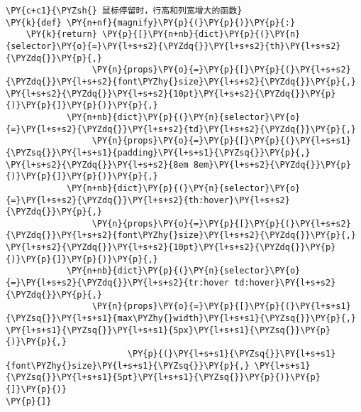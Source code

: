     \begin{tcolorbox}[breakable, size=fbox, boxrule=1pt, pad at break*=1mm,colback=cellbackground, colframe=cellborder]
\begin{Verbatim}[commandchars=\\\{\}]
\PY{c+c1}{\PYZsh{} 鼠标停留时，行高和列宽增大的函数}
\PY{k}{def} \PY{n+nf}{magnify}\PY{p}{(}\PY{p}{)}\PY{p}{:}
    \PY{k}{return} \PY{p}{[}\PY{n+nb}{dict}\PY{p}{(}\PY{n}{selector}\PY{o}{=}\PY{l+s+s2}{\PYZdq{}}\PY{l+s+s2}{th}\PY{l+s+s2}{\PYZdq{}}\PY{p}{,}
                 \PY{n}{props}\PY{o}{=}\PY{p}{[}\PY{p}{(}\PY{l+s+s2}{\PYZdq{}}\PY{l+s+s2}{font\PYZhy{}size}\PY{l+s+s2}{\PYZdq{}}\PY{p}{,} \PY{l+s+s2}{\PYZdq{}}\PY{l+s+s2}{10pt}\PY{l+s+s2}{\PYZdq{}}\PY{p}{)}\PY{p}{]}\PY{p}{)}\PY{p}{,}
            \PY{n+nb}{dict}\PY{p}{(}\PY{n}{selector}\PY{o}{=}\PY{l+s+s2}{\PYZdq{}}\PY{l+s+s2}{td}\PY{l+s+s2}{\PYZdq{}}\PY{p}{,}
                 \PY{n}{props}\PY{o}{=}\PY{p}{[}\PY{p}{(}\PY{l+s+s1}{\PYZsq{}}\PY{l+s+s1}{padding}\PY{l+s+s1}{\PYZsq{}}\PY{p}{,} \PY{l+s+s2}{\PYZdq{}}\PY{l+s+s2}{8em 8em}\PY{l+s+s2}{\PYZdq{}}\PY{p}{)}\PY{p}{]}\PY{p}{)}\PY{p}{,}
            \PY{n+nb}{dict}\PY{p}{(}\PY{n}{selector}\PY{o}{=}\PY{l+s+s2}{\PYZdq{}}\PY{l+s+s2}{th:hover}\PY{l+s+s2}{\PYZdq{}}\PY{p}{,}
                 \PY{n}{props}\PY{o}{=}\PY{p}{[}\PY{p}{(}\PY{l+s+s2}{\PYZdq{}}\PY{l+s+s2}{font\PYZhy{}size}\PY{l+s+s2}{\PYZdq{}}\PY{p}{,} \PY{l+s+s2}{\PYZdq{}}\PY{l+s+s2}{10pt}\PY{l+s+s2}{\PYZdq{}}\PY{p}{)}\PY{p}{]}\PY{p}{)}\PY{p}{,}
            \PY{n+nb}{dict}\PY{p}{(}\PY{n}{selector}\PY{o}{=}\PY{l+s+s2}{\PYZdq{}}\PY{l+s+s2}{tr:hover td:hover}\PY{l+s+s2}{\PYZdq{}}\PY{p}{,}
                 \PY{n}{props}\PY{o}{=}\PY{p}{[}\PY{p}{(}\PY{l+s+s1}{\PYZsq{}}\PY{l+s+s1}{max\PYZhy{}width}\PY{l+s+s1}{\PYZsq{}}\PY{p}{,} \PY{l+s+s1}{\PYZsq{}}\PY{l+s+s1}{5px}\PY{l+s+s1}{\PYZsq{}}\PY{p}{)}\PY{p}{,}
                        \PY{p}{(}\PY{l+s+s1}{\PYZsq{}}\PY{l+s+s1}{font\PYZhy{}size}\PY{l+s+s1}{\PYZsq{}}\PY{p}{,} \PY{l+s+s1}{\PYZsq{}}\PY{l+s+s1}{5pt}\PY{l+s+s1}{\PYZsq{}}\PY{p}{)}\PY{p}{]}\PY{p}{)}
\PY{p}{]}
\end{Verbatim}
\end{tcolorbox}


